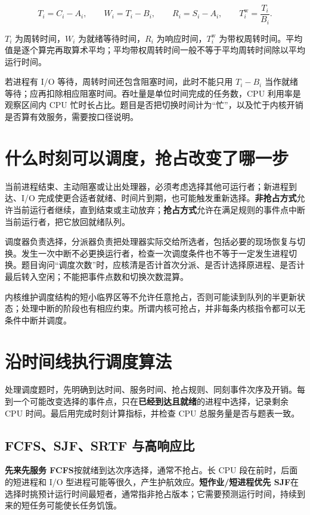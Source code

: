 \[
T_i=C_i-A_i,\qquad W_i=T_i-B_i,\qquad R_i=S_i-A_i,\qquad T_i^{\mathrm{w}}=\frac{T_i}{B_i}.
\]

\(T_i\) 为周转时间，\(W_i\) 为就绪等待时间，\(R_i\) 为响应时间，\(T_i^{\mathrm{w}}\) 为带权周转时间。平均值是逐个算完再取算术平均；平均带权周转时间一般不等于平均周转时间除以平均运行时间。

若进程有 I/O 等待，周转时间还包含阻塞时间，此时不能只用 \(T_i-B_i\) 当作就绪等待；应再扣除相应阻塞时间。吞吐量是单位时间完成的任务数，CPU 利用率是观察区间内 CPU 忙时长占比。题目是否把切换时间计为``忙''，以及忙于内核开销是否算有效服务，需要按口径说明。

\section{什么时刻可以调度，抢占改变了哪一步}\label{os-2-7}

当前进程结束、主动阻塞或让出处理器，必须考虑选择其他可运行者；新进程到达、I/O 完成使更合适者就绪、时间片到期，也可能触发重新选择。\textbf{非抢占方式}允许当前运行者继续，直到结束或主动放弃；\textbf{抢占方式}允许在满足规则的事件点中断当前运行者，把它放回就绪队列。

调度器负责选择，分派器负责把处理器实际交给所选者，包括必要的现场恢复与切换。发生一次中断不必更换运行者，检查一次调度条件也不等于一定发生进程切换。题目询问``调度次数''时，应核清是否计首次分派、是否计选择原进程、是否计最后转入空闲；不能把事件点数和切换次数混算。

内核维护调度结构的短小临界区等不允许任意抢占，否则可能读到队列的半更新状态；处理中断的阶段也有相应约束。所谓内核可抢占，并非每条内核指令都可以无条件中断并调度。

\section{沿时间线执行调度算法}\label{os-2-8}

处理调度题时，先明确到达时间、服务时间、抢占规则、同刻事件次序及开销。每到一个可能改变选择的事件点，只在\textbf{已经到达且就绪}的进程中选择，记录剩余 CPU 时间。最后用完成时刻计算指标，并检查 CPU 总服务量是否与题表一致。

\subsection{FCFS、SJF、SRTF 与高响应比}\label{os-c02-h97}

\textbf{先来先服务 FCFS}按就绪到达次序选择，通常不抢占。长 CPU 段在前时，后面的短进程和 I/O 型进程可能等很久，产生护航效应。\textbf{短作业/短进程优先 SJF}在选择时挑预计运行时间最短者，通常指非抢占版本；它需要预测运行时间，持续到来的短任务可能使长任务饥饿。

